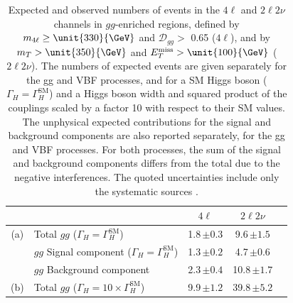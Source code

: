 \begin{table}
\centering
\caption[Expected and observed numbers of events in the $4\ell$ and $2\ell2\nu$
channels in $gg$-enriched regions, defined by $m_{4\ell} \ge \unit{330}{\GeV}$ and
$\mathcal{D}_{gg} >$ 0.65 ($4\ell$), and by $m_{T} >\unit{350}{\GeV}$ and $E_{T}^{\text{miss}} > \unit{100}{\GeV}$ ($2\ell2\nu$).
The numbers of expected events are given separately for the gg and VBF processes,
and for a SM Higgs boson ($\Gamma_{H} = \Gamma_{H}^{\mathrm{SM}}$) and a Higgs
boson width and squared product of the couplings scaled by a
factor 10 with respect to their SM values. The unphysical
expected contributions for the signal and background components are also reported
separately, for the gg and VBF processes. For both processes, the sum of the signal
and background components differs from the total due to the negative interferences.
The quoted uncertainties include only the systematic sources.]{Expected and observed numbers of events in the $4\ell$ and $2\ell2\nu$
channels in $gg$-enriched regions, defined by $m_{4\ell} \ge \unit{330}{\GeV}$ and
$\mathcal{D}_{gg} >$ 0.65 ($4\ell$), and by $m_{T} >\unit{350}{\GeV}$ and $E_{T}^{\text{miss}} > \unit{100}{\GeV}$ ($2\ell2\nu$).
The numbers of expected events are given separately for the gg and VBF processes,
and for a SM Higgs boson ($\Gamma_{H} = \Gamma_{H}^{\mathrm{SM}}$) and a Higgs
boson width and squared product of the couplings scaled by a
factor 10 with respect to their SM values. The unphysical
expected contributions for the signal and background components are also reported
separately, for the gg and VBF processes. For both processes, the sum of the signal
and background components differs from the total due to the negative interferences.
The quoted uncertainties include only the systematic sources \cite{Khachatryan:2014iha}.
}
\begin{tabular}{clccc}
\hline
\hline
 &                                       &  $4\ell$ & $2\ell 2\nu$ \\
\hline
(a)& Total $gg$ ($\Gamma_{H }= \Gamma_{H}^{\mathrm{SM}}$)  & 1.8\,$\pm 0.3$  & 9.6\,$\pm 1.5$ & \\
 & $gg$ Signal component ($\Gamma_{H} = \Gamma_{H}^{\mathrm{SM}}$)   & 1.3\,$\pm 0.2$  & 4.7\,$\pm 0.6$ & \\
 & $gg$ Background component                                          & 2.3\,$\pm 0.4$  & 10.8\,$\pm 1.7$  & \\
(b)& Total $gg$ ($\Gamma_{H} = 10 \times \Gamma_{H}^{\mathrm{SM}}$) & 9.9\,$\pm 1.2$  & 39.8\,$\pm5.2$ & \\

\end{tabular}
\end{table}

